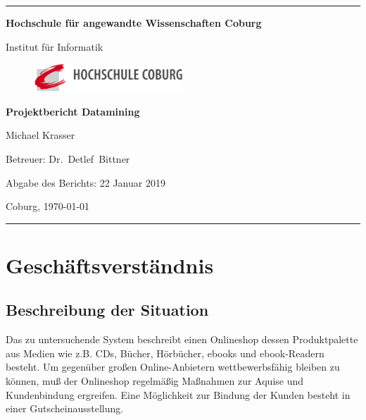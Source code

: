 \documentclass[a4paper,12pt]{article}
\begin{document}
\begin{titlepage}
\thispagestyle{empty} \enlargethispage{1.4in}

\begin{center}

\rule[1ex]{157.5mm}{0.5mm}

\LARGE\bf Hochschule für angewandte Wissenschaften Coburg\\

\vfill

\rm Institut für Informatik


\begin{figure}
	    \centering
				     \includegraphics[width=0.5\textwidth]{Logo.png}
\end{figure}

\vfill

\Huge \bf Projektbericht Datamining

\vfill

\normalsize Michael Krasser

\vfill

Betreuer:  Dr.~Detlef~Bittner

Abgabe des Berichts: 22 Januar 2019

\vfill

Coburg, \today

\rule[-1ex]{157.5mm}{0.5mm}

\vfill

\end{center}

\end{titlepage}

\newpage
\tableofcontents
\pagebreak
\section{Geschäftsverständnis}
\subsection{Beschreibung der Situation}
Das zu untersuchende System beschreibt einen Onlineshop dessen Produktpalette aus Medien wie z.B. CDs, Bücher, Hörbücher, ebooks und ebook-Readern besteht. Um gegenüber großen Online-Anbietern wettbewerbsfähig bleiben zu können, muß der Onlineshop regelmäßig Maßnahmen zur Aquise und Kundenbindung ergreifen. Eine Möglichkeit zur Bindung der Kunden besteht in einer Gutscheinausstellung. 
\end{document}
